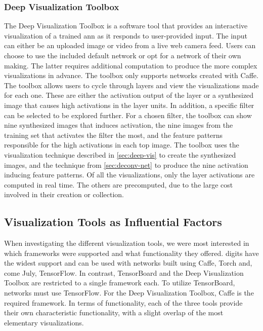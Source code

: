 \subsubsection{Deep Visualization Toolbox}

The Deep Visualization Toolbox is a software tool that provides an interactive visualization of a trained \acrshort{ann} as it responds to user-provided input. The input can either be an uploaded image or video from a live web camera feed. Users can choose to use the included default network or opt for a network of their own making. The latter requires additional computation to produce the more complex visualizations in advance. The toolbox only supports networks created with Caffe. The toolbox allows users to cycle through layers and view the visualizations made for each one. These are either the activation output of the layer or a synthesized image that causes high activations in the layer units. In addition, a specific filter can be selected to be explored further. For a chosen filter, the toolbox can show nine synthesized images that induces activation, the nine images from the training set that activates the filter the most, and the feature patterns responsible for the high activations in each top image. The toolbox uses the visualization technique described in \autoref{sec:deep-vis} to create the synthesized images, and the technique from \autoref{sec:deconv-net} to produce the nine activation inducing feature patterns. Of all the visualizations, only the layer activations are computed in real time. The others are precomputed, due to the large cost involved in their creation or collection.

\subsection{Visualization Tools as Influential Factors}

When investigating the different visualization tools, we were most interested in which frameworks were supported and what functionality they offered. \acrshort{digits} have the widest support and can be used with networks built using Caffe, Torch and, come July, TensorFlow. In contrast, TensorBoard and the Deep Visualization Toolbox are restricted to a single framework each. To utilize TensorBoard, networks must use TensorFlow. For the Deep Visualization Toolbox, Caffe is the required framework. In terms of functionality, each of the three tools provide their own characteristic functionality, with a slight overlap of the most elementary visualizations. \\


